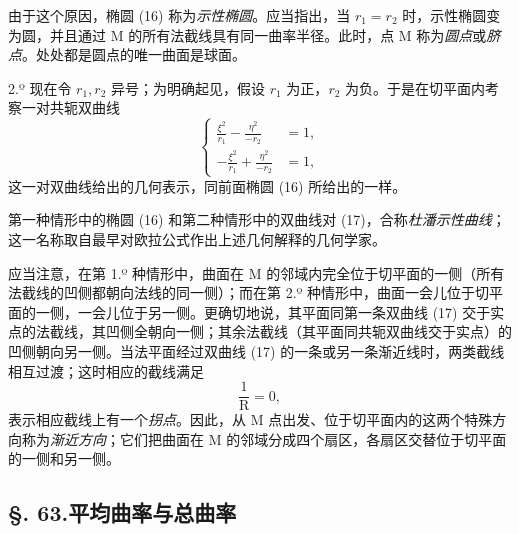 由于这个原因，椭圆 (16) 称为\emph{示性椭圆}。应当指出，当 \(r_1=r_2\) 时，示性椭圆变为圆，并且通过 M 的所有法截线具有同一曲率半径。此时，点 M 称为\emph{圆点}或\emph{脐点}。处处都是圆点的唯一曲面是球面。

2.º 现在令 \(r_1,r_2\) 异号；为明确起见，假设 \(r_1\) 为正，\(r_2\) 为负。于是在切平面内考察一对共轭双曲线
\begin{equation}\tag{17}
\left\{
\begin{aligned}
\frac{\xi^2}{r_1}-\frac{\eta^2}{-r_2}&=1,\\
-\frac{\xi^2}{r_1}+\frac{\eta^2}{-r_2}&=1,
\end{aligned}
\right.
\end{equation}
这一对双曲线给出的几何表示，同前面椭圆 (16) 所给出的一样。

第一种情形中的椭圆 (16) 和第二种情形中的双曲线对 (17)，合称\emph{杜潘示性曲线}；这一名称取自最早对欧拉公式作出上述几何解释的几何学家。

应当注意，在第 1.º 种情形中，曲面在 M 的邻域内完全位于切平面的一侧（所有法截线的凹侧都朝向法线的同一侧）；而在第 2.º 种情形中，曲面一会儿位于切平面的一侧，一会儿位于另一侧。更确切地说，其平面同第一条双曲线 (17) 交于实点的法截线，其凹侧全朝向一侧；其余法截线（其平面同共轭双曲线交于实点）的凹侧朝向另一侧。当法平面经过双曲线 (17) 的一条或另一条渐近线时，两类截线相互过渡；这时相应的截线满足
\[
\frac{1}{\mathrm{R}}=0,
\]
表示相应截线上有一个\emph{拐点}。因此，从 M 点出发、位于切平面内的这两个特殊方向称为\emph{渐近方向}；它们把曲面在 M 的邻域分成四个扇区，各扇区交替位于切平面的一侧和另一侧。

\subsection*{§. 63.\quad 平均曲率与总曲率}

